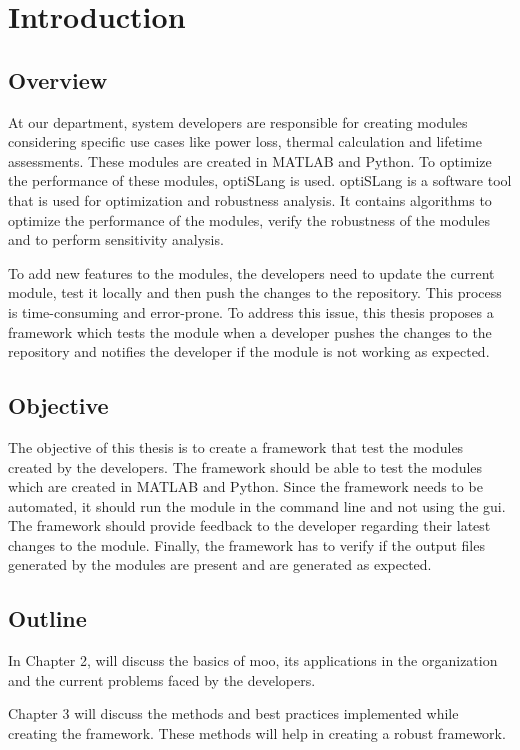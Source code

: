 \chapter{Introduction}
\section{Overview}
At our department, system developers are responsible for creating modules considering specific use cases like power loss, thermal calculation and
lifetime assessments. These modules are created in MATLAB and Python. To optimize the performance of these modules, optiSLang is used. optiSLang is a software 
tool that is used for optimization and robustness analysis. It contains algorithms to optimize the performance of the modules, verify the robustness of the 
modules and to perform sensitivity analysis. 

To add new features to the modules, the developers need to update the current module, test it locally and then push the changes to the repository.
This process is time-consuming and error-prone. To address this issue, this thesis proposes a framework which tests the module when a developer pushes the 
changes to the repository and notifies the developer if the module is not working as expected. 

\section{Objective}
The objective of this thesis is to create a framework that test the modules created by the developers. The framework should be able to test the modules which 
are created in MATLAB and Python. Since the framework needs to be automated, it should run the module in the command line and not using the \acrshort{gui}.
The framework should provide feedback to the developer regarding their latest changes to the module. Finally, the framework has to verify if the output 
files generated by the modules are present and are generated as expected.

\section{Outline}
In Chapter 2, will discuss the basics of \acrlong{moo}, its applications in the organization and the current problems faced by the developers.

Chapter 3 will discuss the methods and best practices implemented while creating the framework. These methods will help in creating a robust framework.

